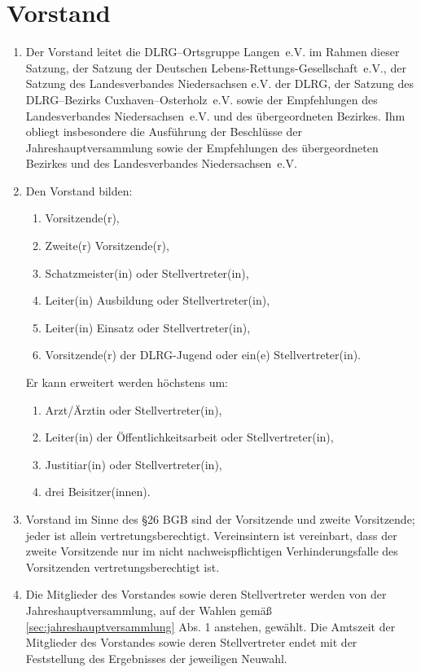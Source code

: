\documentclass[%
12pt, %
a4paper, %
headsepline, %
footsepline, %
parskip, %
headings=normal, %
]{scrartcl}
\begin{document}
\section{Vorstand}
\label{sec:vorstand}
\begin{enumerate}
    \item Der Vorstand leitet die DLRG--Ortsgruppe Langen~e.V. im Rahmen dieser Satzung, der Satzung der Deutschen Lebens-Rettungs-Gesellschaft~e.V., der Satzung des Landesverbandes Niedersachsen e.V. der DLRG, der Satzung des DLRG--Bezirks Cuxhaven--Osterholz~e.V. sowie der Empfehlungen des Landesverbandes Niedersachsen~e.V. und des übergeordneten Bezirkes. Ihm obliegt insbesondere die Ausführung der Beschlüsse der Jahreshauptversammlung sowie der Empfehlungen des übergeordneten Bezirkes und des Landesverbandes Niedersachsen~e.V.
    \item Den Vorstand bilden:\begin{enumerate}[noitemsep]
        \item Vorsitzende(r),
        \item Zweite(r) Vorsitzende(r),
        \item Schatzmeister(in) oder Stellvertreter(in),
        \item Leiter(in) Ausbildung oder Stellvertreter(in),
        \item Leiter(in) Einsatz oder Stellvertreter(in),
        \item Vorsitzende(r) der DLRG-Jugend oder ein(e) Stellvertreter(in).
      \end{enumerate}
      \setcounter{enumii}{7}
      Er kann erweitert werden höchstens um: \begin{enumerate}[noitemsep]
          \item Arzt/Ärztin oder Stellvertreter(in),
          \item Leiter(in) der Öffentlichkeitsarbeit oder Stellvertreter(in),
          \item Justitiar(in) oder Stellvertreter(in),
          \item drei Beisitzer(innen).
        \end{enumerate}
    \item Vorstand im Sinne des \S 26 BGB sind der Vorsitzende und zweite Vorsitzende; jeder ist allein vertretungsberechtigt. Vereinsintern ist vereinbart, dass der zweite Vorsitzende nur im nicht nachweispflichtigen Verhinderungsfalle des Vorsitzenden vertretungsberechtigt ist.
    \item Die Mitglieder des Vorstandes sowie deren Stellvertreter werden von der Jahreshauptversammlung, auf der Wahlen gemäß \ref{sec:jahreshauptversammlung} Abs. 1 anstehen, gewählt. Die Amtszeit der Mitglieder des Vorstandes sowie deren Stellvertreter endet mit der Feststellung des Ergebnisses der jeweiligen Neuwahl.

\end{enumerate}
\end{document}

